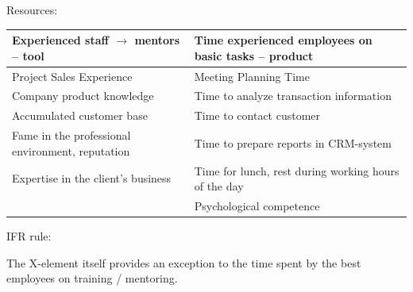 \documentclass[11pt,a4paper]{book}
\begin{document}
Resources:

\begin{center}
  \begin{tabular}{|p{}|p{}|}\hline 
    Experienced staff $\to$ mentors -- tool & Time experienced employees on
    basic tasks -- product\\\hline
    Project Sales Experience & Meeting Planning Time\\\hline
    Company product knowledge & Time to analyze transaction
    information\\\hline
    Accumulated customer base & Time to contact customer\\\hline
    Fame in the professional environment, reputation & Time to prepare reports
    in CRM-system\\\hline
    Expertise in the client’s business& Time for lunch, rest during working
    hours of the day\\\hline
    & Psychological competence\\\hline
  \end{tabular}
\end{center}

IFR rule:

The X-element itself provides an exception to the time spent by the best
employees on training / mentoring.
\end{document}
